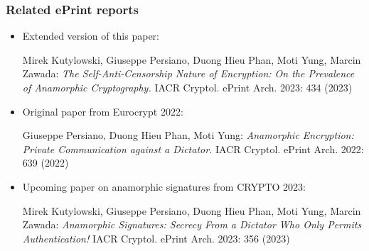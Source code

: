 \documentclass[]{beamer}
\begin{document}
\begin{frame}
\frametitle{Related ePrint reports}
\begin{itemize}
\item Extended version of this paper:

{\color{teal}
Mirek Kutylowski, Giuseppe Persiano, Duong Hieu Phan, Moti Yung, Marcin Zawada:
{\em The Self-Anti-Censorship Nature of Encryption: On the Prevalence of Anamorphic Cryptography.} IACR Cryptol. ePrint Arch. 2023: 434 (2023)
}

\item Original paper from Eurocrypt 2022:

{\color{teal}
	Giuseppe Persiano, Duong Hieu Phan, Moti Yung:
{\em Anamorphic Encryption: Private Communication against a Dictator.} IACR Cryptol. ePrint Arch. 2022: 639 (2022)
}

\item Upcoming paper on anamorphic signatures from CRYPTO 2023:

{\color{teal}
	Mirek Kutylowski, Giuseppe Persiano, Duong Hieu Phan, Moti Yung, Marcin Zawada:
{\em Anamorphic Signatures: Secrecy From a Dictator Who Only Permits Authentication!} IACR Cryptol. ePrint Arch. 2023: 356 (2023)
}

\end{itemize}
\end{frame}
\end{document}

